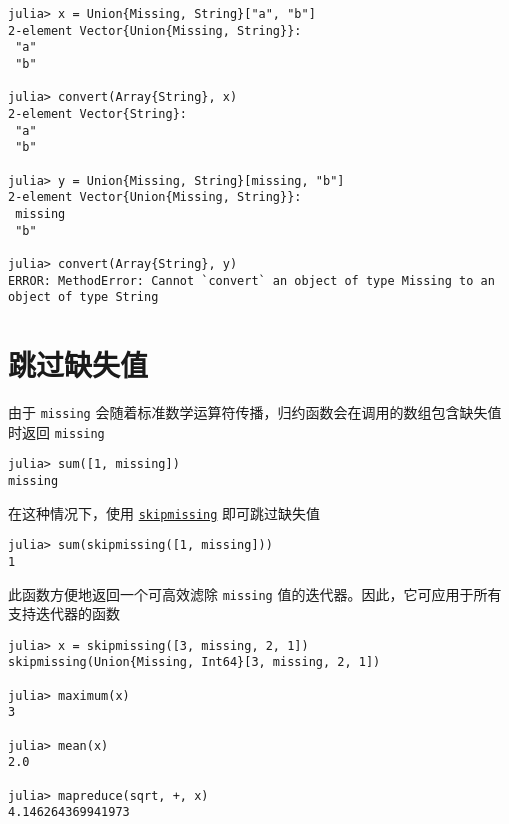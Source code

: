 \begin{verbatim}
julia> x = Union{Missing, String}["a", "b"]
2-element Vector{Union{Missing, String}}:
 "a"
 "b"

julia> convert(Array{String}, x)
2-element Vector{String}:
 "a"
 "b"

julia> y = Union{Missing, String}[missing, "b"]
2-element Vector{Union{Missing, String}}:
 missing
 "b"

julia> convert(Array{String}, y)
ERROR: MethodError: Cannot `convert` an object of type Missing to an object of type String
\end{verbatim}



\hypertarget{12164012210983849465}{}


\section{跳过缺失值}



由于 \texttt{missing} 会随着标准数学运算符传播，归约函数会在调用的数组包含缺失值时返回 \texttt{missing}




\begin{verbatim}
julia> sum([1, missing])
missing
\end{verbatim}



在这种情况下，使用 \hyperlink{2012470681884771400}{\texttt{skipmissing}} 即可跳过缺失值




\begin{verbatim}
julia> sum(skipmissing([1, missing]))
1
\end{verbatim}



此函数方便地返回一个可高效滤除 \texttt{missing} 值的迭代器。因此，它可应用于所有支持迭代器的函数




\begin{verbatim}
julia> x = skipmissing([3, missing, 2, 1])
skipmissing(Union{Missing, Int64}[3, missing, 2, 1])

julia> maximum(x)
3

julia> mean(x)
2.0

julia> mapreduce(sqrt, +, x)
4.146264369941973

\end{verbatim}




